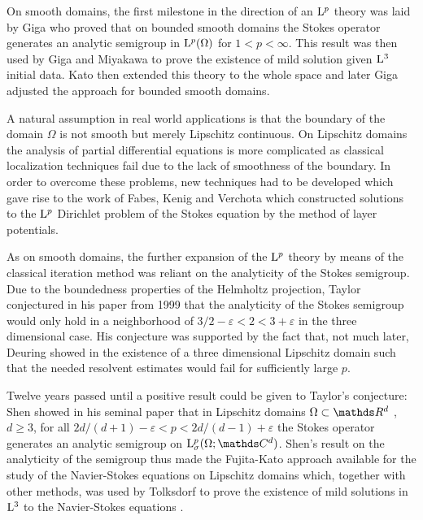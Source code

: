 On smooth domains, the first milestone in the direction of an $\mathrm{L}^p$ theory was laid by Giga \cite{giga} who proved that on bounded smooth domains the Stokes operator generates an analytic semigroup in $\mathrm{L}^p(\Omega)$ for $1 < p < \infty$.
This result was then used by Giga and Miyakawa \cite{gigaMiyakawa} to prove the existence of mild solution given $\mathrm{L}^3$ initial data.
Kato \cite{katoExtend} then extended this theory to the whole space and later Giga \cite{gigaAdjust} adjusted the approach for bounded smooth domains.

A natural assumption in real world applications is that the boundary of the domain $\Omega$ is not smooth but merely Lipschitz continuous. 
On Lipschitz domains the analysis of partial differential equations is more complicated as classical localization techniques fail due to the lack of smoothness of the boundary.
In order to overcome these problems, new techniques had to be developed which gave rise to the work of Fabes, Kenig and Verchota \cite{fabesKenigVerchota} which constructed solutions to the $\mathrm{L}^p$ Dirichlet problem of the Stokes equation by the method of layer potentials.

As on smooth domains, the further expansion of the $\mathrm{L}^p$ theory by means of the classical iteration method was reliant on the analyticity of the Stokes semigroup.
Due to the boundedness properties of the Helmholtz projection, Taylor conjectured in his paper \cite{taylor} from 1999 that the analyticity of the Stokes semigroup would only hold in a neighborhood of $3/2 - \varepsilon < 2 < 3 + \varepsilon$ in the three dimensional case.
His conjecture was supported by the fact that, not much later, Deuring showed in \cite{deuring} the existence of a three dimensional Lipschitz domain such that the needed resolvent estimates would fail for sufficiently large $p$.

Twelve years passed until a positive result could be given to Taylor's conjecture:  Shen showed in his seminal paper \cite{Shen2012} that in Lipschitz domains $\Omega \subset \R^d$ , $d \geq 3$, for all $2d/( d + 1) - \varepsilon < p < 2d/(d - 1) + \varepsilon$ the Stokes operator generates an analytic semigroup on $\Ell^p_\sigma(\Omega; \C^d)$.
Shen's result on the analyticity of the semigroup thus made the Fujita-Kato approach available for the study of the Navier-Stokes equations on Lipschitz domains which, together with other methods, was used by Tolksdorf to prove the existence of mild solutions in $\mathrm{L}^3$ to the Navier-Stokes equations \cite{tolksdorf}.

